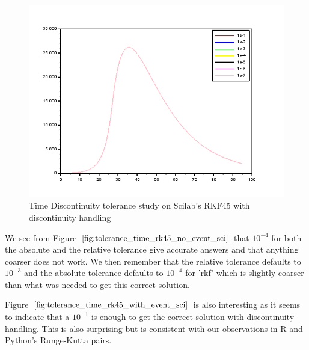\begin{figure}[h]
	\centering
	\includegraphics[width=0.7\linewidth]{./figures/tolerance_time_rk45_with_event_sci}
	\caption{Time Discontinuity tolerance study on Scilab's RKF45 with discontinuity handling}
	\label{fig:tolerance_time_rk45_with_event_sci}
\end{figure}

We see from Figure $\ref{fig:tolerance_time_rk45_no_event_sci}$ that $10^{-4}$ for both the absolute and the relative tolerance give accurate answers and that anything coarser does not work. We then remember that the relative tolerance defaults to $10^{-3}$ and the absolute tolerance defaults to $10^{-4}$ for 'rkf' which is slightly coarser than what was needed to get this correct solution.

Figure $\ref{fig:tolerance_time_rk45_with_event_sci}$ is also interesting as it seems to indicate that a $10^{-1}$ is enough to get the correct solution with discontinuity handling. This is also surprising but is consistent with our observations in R and Python's Runge-Kutta pairs.

